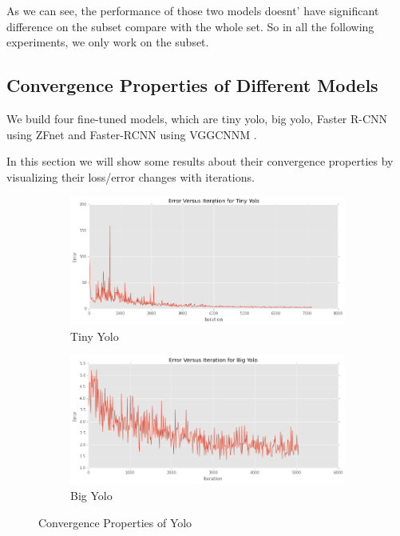 As we can see, the performance of those two models doesnt' have 
significant difference on the subset compare with the whole set. 
So in all the following experiments, we only work on the subset.

\subsection{Convergence Properties of Different Models}
We build four fine-tuned models, which are
tiny yolo, big yolo, Faster R-CNN using ZFnet and 
Faster-RCNN using VGG\textunderscore CNN\textunderscore M \cite{chatfield2014return}.

In this section we will show some results about 
their convergence properties by visualizing their loss/error 
changes with iterations.

\begin{figure}[H]
\centering
\begin{subfigure}[t]{.49\textwidth}
    \centering
    \includegraphics[width=1.0\linewidth]{img/yolo_tiny_cov.png}
    \caption{Tiny Yolo}
\end{subfigure}
\begin{subfigure}[t]{.49\textwidth}
    \centering
    \includegraphics[width=1.0\linewidth]{img/yolo_big_cov.png}
    \caption{Big Yolo}
\end{subfigure}
\caption{Convergence Properties of Yolo}
\end{figure}

